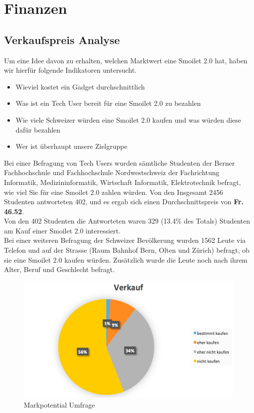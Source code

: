 \chapter{Finanzen}
\label{chap:finanzen}

\section{Verkaufspreis Analyse}
Um eine Idee davon zu erhalten, welchen Marktwert eine Smoilet 2.0 hat, haben wir hierf\"ur folgende Indikatoren untersucht.
\begin{itemize}
\item Wieviel kostet ein Gadget durchschnittlich
\item Was ist ein Tech User bereit f\"ur eine Smoilet 2.0 zu bezahlen 
\item Wie viele Schweizer w\"urden eine Smoilet 2.0 kaufen und was w\"urden diese daf\"ur bezahlen
\item Wer ist \"uberhaupt unsere Zielgruppe 
\end{itemize}
Bei einer Befragung von Tech Users wurden s\"amtliche Studenten der Berner Fachhochschule und Fachhochschule Nordwestschweiz der Fachrichtung Informatik, Medizininformatik, Wirtschaft Informatik, Elektrotechnik befragt, wie viel Sie f\"ur eine Smoilet 2.0 zahlen w\"urden. Von den Insgesamt 2456 Studenten antworteten 402, und es ergab sich einen Durchschnittspreis von \textbf{Fr. 46.52}. \\
Von den 402 Studenten die Antworteten waren 329 (13.4\% des Totals) Studenten am Kauf einer Smoilet 2.0 interessiert.\\
Bei einer weiteren Befragung der Schweizer Bev\"olkerung wurden 1562 Leute via Telefon und auf der Strasse (Raum Bahnhof Bern, Olten und Z\"urich) befragt, ob sie eine Smoilet 2.0 kaufen w\"urden. Zus\"atzlich wurde die Leute noch nach ihrem Alter, Beruf und Geschlecht befragt.

\begin{figure}[H]
\centering
		\includegraphics[scale=0.3]{bilder/marktpot.png}
\caption{Markpotential Umfrage}
\label{fig:marktpot}
\end{figure}

